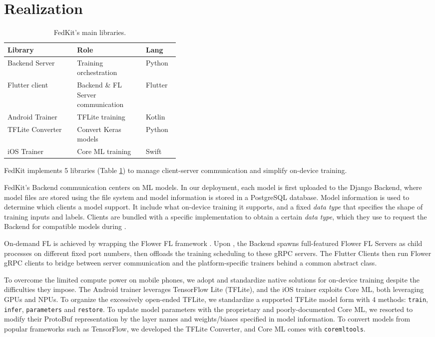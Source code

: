 \documentclass[letterpaper]{article} %
\begin{document}
\section{Realization}

\newcommand{\dt}{\textit{data type}}

\begin{table}
\centering
\begin{tabular}{lp{0.4\linewidth}l}
    Library&Role&Lang\\
    \hline
    Backend Server&Training orchestration&Python\\
    Flutter client&Backend \& FL Server communication&Flutter\\
    Android Trainer&TFLite training&Kotlin\\
    TFLite Converter&Convert Keras models&Python\\
    iOS Trainer&Core ML training&Swift
\end{tabular}
\caption{FedKit's main libraries.}
\label{table:libs}
\end{table}

FedKit implements 5 libraries (Table \ref{table:libs}) to
manage client-server communication and simplify on-device training.

FedKit's Backend communication centers on ML models.
In our deployment, each model is first uploaded to the Django Backend,
where model files are stored using the file system and
model information is stored in a PostgreSQL database.
Model information is used to determine which clients a model support.
It include what on-device training it supports, and
a fixed \dt{} that specifies the shape of training inputs and labels.
Clients are bundled with a specific implementation to obtain a certain \dt,
which they use to request the Backend for compatible models during \modelreq.

On-demand FL is achieved by wrapping the Flower FL framework
\cite{beutel2020flower}.
Upon \traininginit,
the Backend spawns full-featured Flower FL Servers as child processes on
different fixed port numbers,
then offloads the training scheduling to these gRPC servers.
The Flutter Clients then run Flower gRPC clients to bridge between
server communication and the platform-specific trainers
behind a common abstract class.

To overcome the limited compute power on mobile phones,
we adopt and standardize native solutions for on-device training
despite the difficulties they impose.
The Android trainer leverages TensorFlow Lite (TFLite),
and the iOS trainer exploits Core ML,
both leveraging GPUs and NPUs.
To organize the excessively open-ended TFLite,
we standardize a supported TFLite model form with 4 methods:
\lstinline{train},
\lstinline{infer},
\lstinline{parameters} and
\lstinline{restore}.
To update model parameters with the proprietary and poorly-documented Core ML,
we resorted to modify their ProtoBuf representation by
the layer names and weights/biases specified in model information.
To convert models from popular frameworks such as TensorFlow,
we developed the TFLite Converter,
and Core ML comes with \lstinline{coremltools}.
\end{document}
